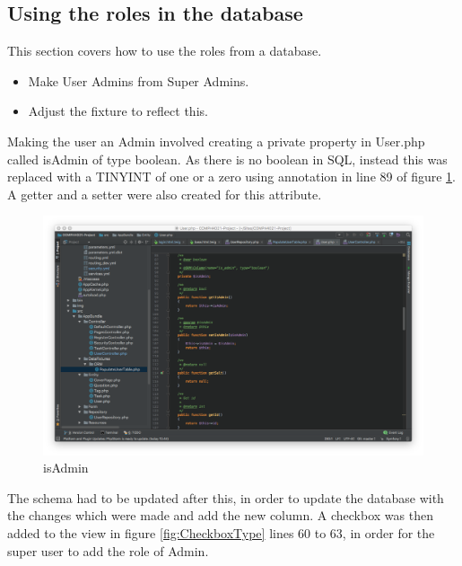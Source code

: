 \subsection{Using the roles in the database}

This section covers how to use the roles from a database.

\begin{itemize}
  \item Make User Admins from Super Admins.
    \item Adjust the fixture to reflect this.
\end{itemize}

Making the user an Admin involved creating a private property in User.php called isAdmin of type boolean. As there is no boolean in SQL, instead this was replaced with a TINYINT of one or a zero using annotation in line 89 of figure \ref{fig:isAdmin}. A getter and a setter were also created for this attribute.

\begin{figure}[htbp]
   \centering
   \includegraphics[width=400pt]{figures/is_admin.png} %
   \caption{isAdmin}
   \label{fig:isAdmin}
\end{figure}

The schema had to be updated after this, in order to update the database with the changes which were made and add the new column. A checkbox was then added to the view in figure \ref{fig:CheckboxType} lines 60 to 63, in order for the super user to add the role of Admin. 


